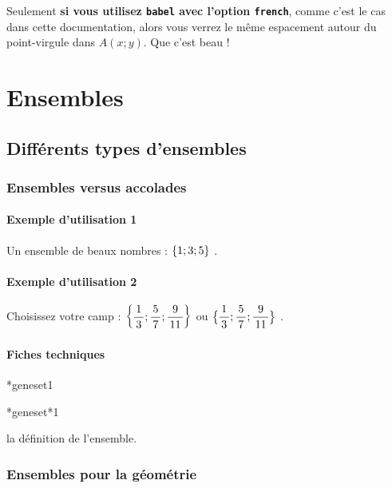 \documentclass[12pt,a4paper]{scrartcl}
\makeatletter
\theoremstyle{definition}
\newcommand\IDmacro{\@ifstar{\@IDmacro@star}{\@IDmacro@no@star}}
\newcommand\@IDmacro@no@star[3]{%
    \texttt{%
    	\textbackslash#1%
    	\IfStrEq{#2}{0}{}{%
    		\,\,[#2 Option%
				\IfStrEq{#2}{1}{}{s}]%
			}%
	    \IfStrEq{#3}{}{}{%
	    		\,\,(#3 Argument%
				\IfStrEq{#3}{1}{}{s})%
			}
	   	}
    \immediate\write\tempfile{macro,#1,#2,#3}%
}
\newcommand\@IDmacro@star[2]{%
    \@IDmacro@no@star{#1}{0}{#2}%
}
\newcommand\@IDoptarg{\@ifstar{\@IDoptarg@star}{\@IDoptarg@no@star}}
\newcommand\@IDoptarg@star[2]{%
	\vspace{0.5em}
	\textbf{---} \texttt{#1%
		\IfStrEq{#2}{}{:}{\,#2:}%
	}%
}
\newcommand\@IDoptarg@no@star[2]{%
	\IfStrEq{#2}{}{%
		\@IDoptarg@star{#1}{}%
	}{%
		\@IDoptarg@star{#1}{#2}%
	}%
}
\newcommand\IDarg[1]{%
	\@IDoptarg{Argument}{#1}%
}
\makeatother
\begin{document}
Seulement \textbf{si vous utilisez \texttt{babel} avec l'option \texttt{french}}, comme c'est le cas dans cette documentation, alors vous verrez le même espacement autour du point-virgule dans $A(x;y)$. Que c'est beau !




\section{Ensembles}

    \subsection{Différents types d'ensembles}

        \subsubsection{Ensembles versus accolades}

            \paragraph{Exemple d'utilisation 1}

\begin{tcblisting}{}
Un ensemble de beaux nombres : $\geneset{1 ; 3 ; 5}$ .
\end{tcblisting}


            \paragraph{Exemple d'utilisation 2}

\begin{tcblisting}{}
Choisissez votre camp :
$\displaystyle \geneset{\frac{1}{3} ; \frac{5}{7} ; \frac{9}{11}}$
ou 
$\displaystyle \geneset*{\frac{1}{3} ; \frac{5}{7} ; \frac{9}{11}}$ .
\end{tcblisting}


            \paragraph{Fiches techniques}

\IDmacro*{geneset}{1}

\IDmacro*{geneset*}{1}

\IDarg{} la définition de l'ensemble.


        \subsubsection{Ensembles pour la géométrie}
\end{document}
